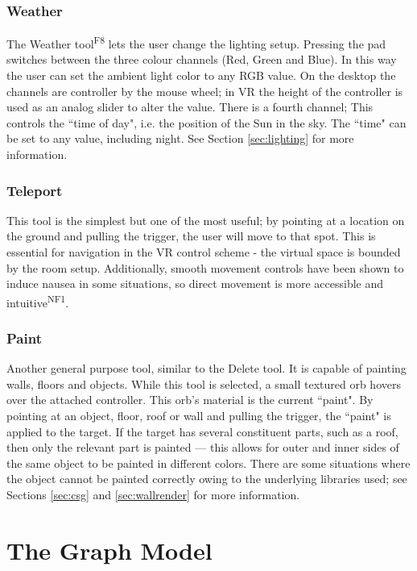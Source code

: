 \subsubsection*{Weather}
The Weather tool\textsuperscript{F8} lets the user change the lighting setup. Pressing the pad switches between the three colour channels (Red, Green and Blue). In this way the user can set the ambient light color to any RGB value. On the desktop the channels are controller by the mouse wheel; in VR the height of the controller is used as an analog slider to alter the value. There is a fourth channel; This controls the ``time of day", i.e. the position of the Sun in the sky. The ``time" can be set to any value, including night. See Section \ref{sec:lighting} for more information.

\subsubsection*{Teleport}
This tool is the simplest but one of the most useful; by pointing at a location on the ground and pulling the trigger, the user will move to that spot. This is essential for navigation in the VR control scheme - the virtual space is bounded by the room setup. Additionally, smooth movement controls have been shown to induce nausea in some situations, so direct movement is more accessible and intuitive\textsuperscript{NF1}.

\subsubsection*{Paint}
Another general purpose tool, similar to the Delete tool. It is capable of painting walls, floors and objects. While this tool is selected, a small textured orb hovers over the attached controller. This orb's material is the current ``paint". By pointing at an object, floor, roof or wall and pulling the trigger, the ``paint" is applied to the target. If the target has several constituent parts, such as a roof, then only the relevant part is painted --- this allows for outer and inner sides of the same object to be painted in different colors. There are some situations where the object cannot be painted correctly owing to the underlying libraries used; see Sections \ref{sec:csg} and \ref{sec:wallrender} for more information.


\section{The Graph Model}
\label{sec:graph}


